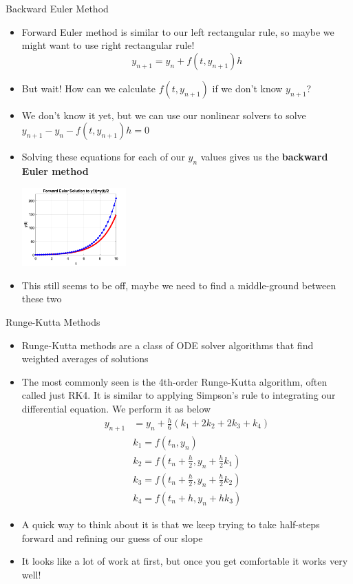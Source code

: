 {}\documentclass[letterpaper,
compress,
xcolor=x11names,
]{beamer}
\begin{document}

\begin{frame}{Backward Euler Method}
	\footnotesize
	\begin{itemize}
		\item Forward Euler method is similar to our left rectangular rule, so maybe we might want to use right rectangular rule!
		\begin{equation*}
			y_{n+1} = y_n + f(t,y_{n+1})h
		\end{equation*}
		\item<2-> But wait! How can we calculate $f(t,y_{n+1})$ if we don't know $y_{n+1}$?
		\item<3-> We don't know it yet, but we can use our nonlinear solvers to solve $y_{n+1} - y_n - f(t,y_{n+1})h = 0$
		\item<3-> Solving these equations for each of our $y_n$ values gives us the \textbf{backward Euler method}
		\begin{center}
			\includegraphics[height = 3cm]{Imp_Euler_w_Sln.png}
		\end{center}
		\item<4-> This still seems to be off, maybe we need to find a middle-ground between these two
	\end{itemize}
\end{frame}


\begin{frame}{Runge-Kutta Methods}
	\footnotesize
	\begin{itemize}
		\item Runge-Kutta methods are a class of ODE solver algorithms that find weighted averages of solutions
		\item<2-> The most commonly seen is the 4th-order Runge-Kutta algorithm, often called just RK4. It is similar to applying Simpson's rule to integrating our differential equation. We perform it as below
		\begin{align*}
			y_{n+1} &= y_n + \frac{h}{6}(k_1 + 2k_2 + 2k_3 + k_4) \\
			&k_1 = f(t_n, y_n) \\
			&k_2 = f(t_n + \frac{h}{2}, y_n + \frac{h}{2}k_1) \\
			&k_3 = f(t_n + \frac{h}{2}, y_n + \frac{h}{2}k_2) \\
			&k_4 = f(t_n + h, y_n + hk_3) 
		\end{align*}
		\item<3-> A quick way to think about it is that we keep trying to take half-steps forward and refining our guess of our slope
		\item<3-> It looks like a lot of work at first, but once you get comfortable it works very well!
	\end{itemize}
\end{frame}
\end{document}
